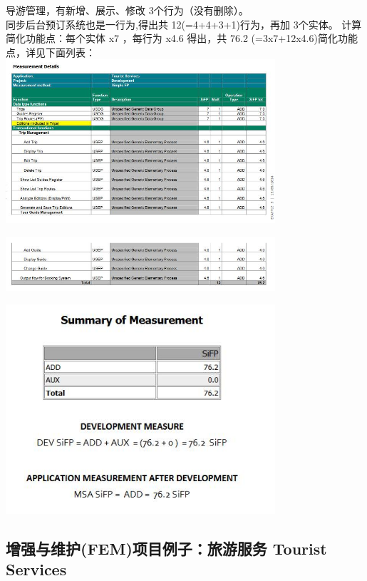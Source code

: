 导游管理，有新增、展示、修改 3个行为（没有删除）。\\

同步后台预订系统也是一行为,得出共 12(=4+4+3+1)行为，再加 3个实体。 计算简化功能点：每个实体 x7 ，每行为 x4.6 得出，共 76.2 (=3x7+12x4.6)简化功能点，详见下面列表： \\


\includegraphics[width=10cm]{微信截图_20220325104633.jpg}


\includegraphics[width=10cm]{微信截图_20220325104709.jpg}


\includegraphics[width=10cm]{微信截图_20220325104725.jpg}

\hypertarget{ux4e0eux56fdux9645ux529fux80fdux70b9ifpugux7684ux504fux5dee}{%
\subsection{增强与维护(FEM)项目例子：旅游服务 Tourist Services}\label{ux4e0eux56fdux9645ux529fux80fdux70b9ifpugux7684ux504fux5dee}}

